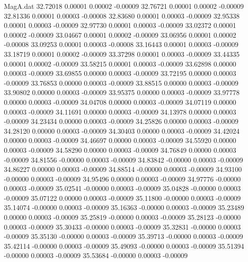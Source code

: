\begin{filecontents}{MagA.dat}
  32.72018    0.00001    0.00002   -0.00009
  32.76721    0.00001    0.00002   -0.00009
  32.81336    0.00001    0.00003   -0.00008
  32.83680    0.00001    0.00003   -0.00009
  32.95338    0.00001    0.00003   -0.00009
  32.97730    0.00001    0.00003   -0.00009
  33.02372    0.00001    0.00002   -0.00009
  33.04667    0.00001    0.00002   -0.00009
  33.06956    0.00001    0.00002   -0.00008
  33.09253    0.00001    0.00003   -0.00008
  33.16443    0.00001    0.00003   -0.00009
  33.18719    0.00001    0.00002   -0.00009
  33.37298    0.00001    0.00003   -0.00009
  33.44335    0.00001    0.00002   -0.00009
  33.58215    0.00001    0.00003   -0.00009
  33.62898    0.00000    0.00003   -0.00009
  33.69855    0.00000    0.00003   -0.00009
  33.72195    0.00000    0.00003   -0.00009
  33.76853    0.00000    0.00003   -0.00009
  33.88515    0.00000    0.00003   -0.00009
  33.90802    0.00000    0.00003   -0.00009
  33.95375    0.00000    0.00003   -0.00009
  33.97778    0.00000    0.00003   -0.00009
  34.04708    0.00000    0.00003   -0.00009
  34.07119    0.00000    0.00003   -0.00009
  34.11691    0.00000    0.00003   -0.00009
  34.13978    0.00000    0.00003   -0.00009
  34.23434    0.00000    0.00003   -0.00009
  34.25826    0.00000    0.00003   -0.00009
  34.28120    0.00000    0.00003   -0.00009
  34.30403    0.00000    0.00003   -0.00009
  34.42024    0.00000    0.00003   -0.00009
  34.46697    0.00000    0.00003   -0.00009
  34.55920    0.00000    0.00003   -0.00009
  34.58290    0.00000    0.00003   -0.00009
  34.76849    0.00000    0.00003   -0.00009
  34.81556   -0.00000    0.00003   -0.00009
  34.83842   -0.00000    0.00003   -0.00009
  34.86227    0.00000    0.00003   -0.00009
  34.88514   -0.00000    0.00003   -0.00009
  34.93100   -0.00000    0.00003   -0.00009
  34.95496    0.00000    0.00003   -0.00009
  34.97776   -0.00000    0.00003   -0.00009
  35.02541   -0.00000    0.00003   -0.00009
  35.04828   -0.00000    0.00003   -0.00009
  35.07122    0.00000    0.00003   -0.00009
  35.11800   -0.00000    0.00003   -0.00009
  35.14074   -0.00000    0.00003   -0.00009
  35.16363   -0.00000    0.00003   -0.00009
  35.23489    0.00000    0.00003   -0.00009
  35.25819   -0.00000    0.00003   -0.00009
  35.28123   -0.00000    0.00003   -0.00009
  35.30433   -0.00000    0.00003   -0.00009
  35.32831   -0.00000    0.00003   -0.00009
  35.35130   -0.00000    0.00003   -0.00009
  35.39713   -0.00000    0.00003   -0.00009
  35.42114   -0.00000    0.00003   -0.00009
  35.49093   -0.00000    0.00003   -0.00009
  35.51394   -0.00000    0.00003   -0.00009
  35.53684   -0.00000    0.00003   -0.00009

\end{filecontents}
